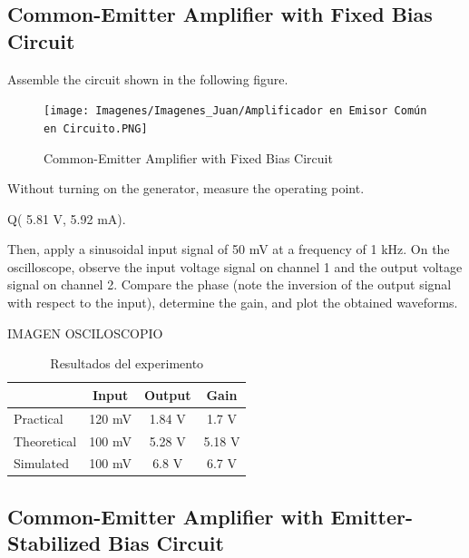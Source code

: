 \subsection{Common-Emitter Amplifier with Fixed Bias Circuit}
Assemble the circuit shown in the following figure.
\begin{figure}[h]
    \centering
    \texttt{[image: Imagenes/Imagenes\_Juan/Amplificador en Emisor Común en Circuito.PNG]}
    \caption{Common-Emitter Amplifier with Fixed Bias Circuit}
    \label{circuit1}
\end{figure}

Without turning on the generator, measure the operating point.

\begin{center}
    Q( 5.81 V, 5.92 mA).
\end{center}


Then, apply a sinusoidal input signal of 50 mV at a frequency of 1 kHz.
On the oscilloscope, observe the input voltage signal on channel 1 and the output voltage signal on channel 
2. Compare the phase (note the inversion of the output signal with respect to the input), determine the 
gain, and plot the obtained waveforms.

\begin{center}
    IMAGEN OSCILOSCOPIO
\end{center}

\begin{table}[H]
\centering
\caption{Resultados del experimento}
\label{tab:resultados}
\begin{tabular}{lccc} %
\toprule
 & Input & Output & Gain \\ 
\midrule
Practical   & 120 mV & 1.84 V & 1.7 V\\ 
Theoretical & 100 mV & 5.28 V & 5.18 V\\ 
Simulated   & 100 mV & 6.8 V & 6.7 V \\ 
\bottomrule
\end{tabular}
\end{table}

\newpage

\subsection{Common-Emitter Amplifier with Emitter-Stabilized Bias Circuit}

